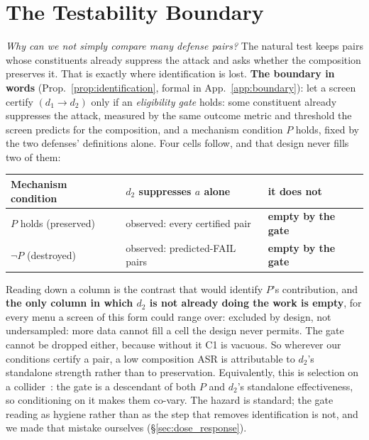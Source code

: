 \documentclass{article}
\begin{document}
\section{The Testability Boundary}
\label{sec:testability}

\emph{Why can we not simply compare many defense pairs?} The natural test keeps pairs whose constituents already suppress the attack and asks whether the composition preserves it. That is exactly where identification is lost. \textbf{The boundary in words} (Prop.~\ref{prop:identification}, formal in App.~\ref{app:boundary}): let a screen certify $(d_1 \to d_2)$ only if an \emph{eligibility gate} holds: some constituent already suppresses the attack, measured by the same outcome metric and threshold the screen predicts for the composition, and a mechanism condition $P$ holds, fixed by the two defenses' definitions alone. Four cells follow, and that design never fills two of them:

\begin{center}\small\vspace{-7pt}\setlength{\tabcolsep}{5pt}
\begin{tabular}{@{}lll@{}}
\toprule
Mechanism condition & $d_2$ suppresses $a$ alone & it does not \\
\midrule
$P$ holds (preserved) & observed: every certified pair & \textbf{empty by the gate} \\
$\neg P$ (destroyed) & observed: predicted-FAIL pairs & \textbf{empty by the gate} \\
\bottomrule
\end{tabular}
\vspace{-5pt}\end{center}

\noindent Reading down a column is the contrast that would identify $P$'s contribution, and \textbf{the only column in which $d_2$ is not already doing the work is empty}, for every menu a screen of this form could range over: excluded by design, not undersampled: more data cannot fill a cell the design never permits. The gate cannot be dropped either, because without it C1 is vacuous. So wherever our conditions certify a pair, a low composition ASR is attributable to $d_2$'s standalone strength rather than to preservation. Equivalently, this is selection on a collider~\citep{elwert2014endogenous,pearl2009causality}: the gate is a descendant of both $P$ and $d_2$'s standalone effectiveness, so conditioning on it makes them co-vary. The hazard is standard; the gate reading as hygiene rather than as the step that removes identification is not, and we made that mistake ourselves (\S\ref{sec:dose_response}).
\end{document}
